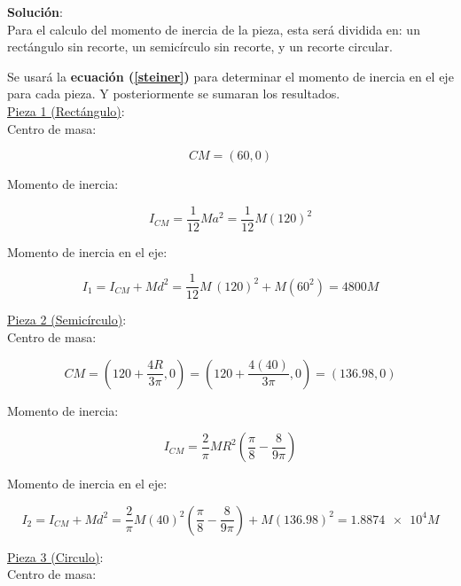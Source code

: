 \documentclass[letter,oneside,11pt]{article}
\begin{document}
\begin{minipage}[b]{.9\linewidth}
\textbf{Solución}:\\
Para el calculo del momento de inercia de la pieza, esta será dividida en: un
rectángulo sin recorte, un semicírculo sin recorte, y un recorte circular.

Se usará la \textbf{ecuación (\ref{steiner})} para determinar el momento de
inercia en el eje para cada pieza. Y posteriormente se sumaran los resultados.
\\

\underline{Pieza 1 (Rectángulo)}:\\
Centro de masa:

\begin{equation*}
    CM = (60,0)
\end{equation*}

Momento de inercia:

\begin{equation*}
    I_{CM} = \frac{1}{12} M a^2 = \frac{1}{12} M (120)^2
\end{equation*}

Momento de inercia en el eje:

\begin{equation*}
    I_1 = I_{CM} + M d^2 = \frac{1}{12} M\, (120)^2 + M (60^2) = 4800 M
\end{equation*}

\underline{Pieza 2 (Semicírculo)}:\\
Centro de masa:

\begin{equation*}
    CM = \left( 120 + \frac{4R}{3\pi}, 0 \right) = \left( 120 + \frac{4 (40)}{3\pi}, 0 \right) = (136.98, 0)
\end{equation*}

Momento de inercia:

\begin{equation*}
    I_{CM} = \frac{2}{\pi} M R^2 \left( \frac{\pi}{8} - \frac{8}{9\pi} \right)
\end{equation*}

Momento de inercia en el eje:

\begin{equation*}
    I_2 = I_{CM} + M d^2 = \frac{2}{\pi} M (40)^2 \left( \frac{\pi}{8} - \frac{8}{9\pi} \right) + M (136.98)^2 = \num{1.8874e4} M
\end{equation*}

\underline{Pieza 3 (Circulo)}:\\
Centro de masa:


\end{minipage}
\end{document}
